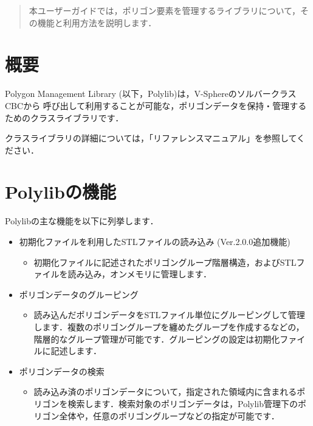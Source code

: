 {\begin{abstract}
本ユーザーガイドでは，ポリゴン要素を管理するライブラリについて，その機能と利用方法を説明します．
\end{abstract}

%
\section{概要}
Polygon Management Library (以下，Polylib)は，V-SphereのソルバークラスCBCから
呼び出して利用することが可能な，ポリゴンデータを保持・管理するためのクラスライブラリです．

クラスライブラリの詳細については，「リファレンスマニュアル」を参照してください．

%
\section{Polylibの機能}
Polylibの主な機能を以下に列挙します．

\begin{itemize}
 \item 初期化ファイルを利用したSTLファイルの読み込み  (Ver.2.0.0追加機能)
  \begin{itemize}
   \item 初期化ファイルに記述されたポリゴングループ階層構造，およびSTLファイルを読み込み，オンメモリに管理します．
  \end{itemize}
  \vspace{2mm}
  
 \item ポリゴンデータのグルーピング
  \begin{itemize}
   \item 読み込んだポリゴンデータをSTLファイル単位にグルーピングして管理します．複数のポリゴングループを纏めたグループを作成するなどの，階層的なグループ管理が可能です．グルーピングの設定は初期化ファイルに記述します．
  \end{itemize}
  \vspace{2mm}
  
 \item ポリゴンデータの検索
  \begin{itemize}
   \item 読み込み済のポリゴンデータについて，指定された領域内に含まれるポリゴンを検索します．検索対象のポリゴンデータは，Polylib管理下のポリゴン全体や，任意のポリゴングループなどの指定が可能です．
  \end{itemize}
  \vspace{2mm}
  

\end{itemize}}
